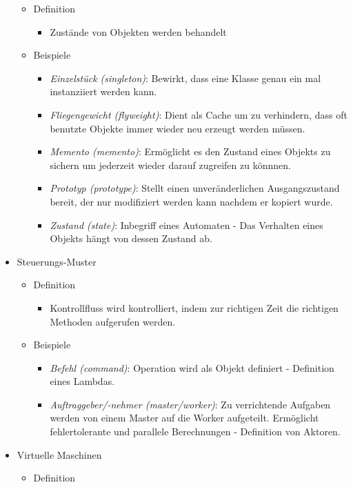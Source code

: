 \documentclass{article}
\begin{document}
\begin{itemize}
\begin{itemize}
    \item Definition
    \begin{itemize}
      \item Zustände von Objekten werden behandelt
    \end{itemize}
    \item Beispiele
    \begin{itemize}
      \item \textit{Einzelstück (singleton)}: Bewirkt, dass eine Klasse genau ein mal instanziiert werden kann.
      \item \textit{Fliegengewicht (flyweight)}: Dient als Cache um zu verhindern, dass oft benutzte Objekte immer wieder neu erzeugt werden müssen.
      \item \textit{Memento (memento)}: Ermöglicht es den Zustand eines Objekts zu sichern um jederzeit wieder darauf zugreifen zu könnnen.
      \item \textit{Prototyp (prototype)}: Stellt einen unveränderlichen Ausgangszustand bereit, der nur modifiziert werden kann nachdem er kopiert wurde.
      \item \textit{Zustand (state)}: Inbegriff eines Automaten - Das Verhalten eines Objekts hängt von dessen Zustand ab.
    \end{itemize}
  \end{itemize}
  \item Steuerungs-Muster
  \begin{itemize}
    \item Definition
    \begin{itemize}
      \item Kontrollfluss wird kontrolliert, indem zur richtigen Zeit die richtigen Methoden aufgerufen werden.
    \end{itemize}
    \item Beispiele
    \begin{itemize}
      \item \textit{Befehl (command)}: Operation wird als Objekt definiert - Definition eines Lambdas.
      \item \textit{Auftraggeber/-nehmer (master/worker)}: Zu verrichtende Aufgaben werden von einem Master auf die Worker aufgeteilt. Ermöglicht fehlertolerante und parallele Berechnungen - Definition von Aktoren.
    \end{itemize}
  \end{itemize}
  \item Virtuelle Maschinen
  \begin{itemize}
    \item Definition

\end{itemize}
\end{itemize}
\end{document}
